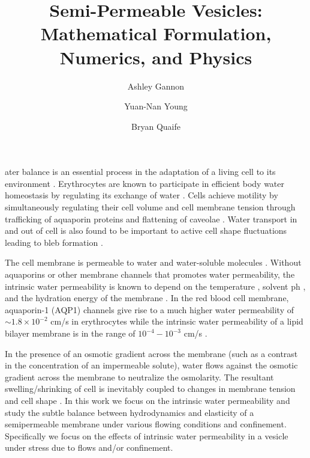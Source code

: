 \documentclass[9pt,twocolumn,twoside,lineno]{pnas-new}
\title{Semi-Permeable Vesicles: Mathematical Formulation, Numerics, and
Physics}
\author[a]{Ashley Gannon}
\author[b]{Yuan-Nan Young}
\author[a,1]{Bryan Quaife}
\affil[a]{Department of Scientific Computing, Florida State University}
\affil[b]{Department of Mathematical Sciences, New Jeresy Institute of
Technology}
\begin{document}
\maketitle
\thispagestyle{firststyle}


ater balance is an essential process in the adaptation of a living cell to its environment \cite{AlbertsMolecularBiology}.  Erythrocytes are known to  participate in efficient body water homeostasis by regulating its exchange of water  \cite{YangMaVerkman2001_JBC,SugieIntaglietta2018_AmJPhysiolHCP}.  Cells achieve motility by simultaneously regulating their cell volume and cell membrane tension through trafficking of aquaporin proteins \cite{SaadounPapadopoulosWatanabeEtAl2005_JCS,Verkman2008_JMM,BerthaudEtAl2016_SM} and flattening of caveolae \cite{Keren2011_EurBJ}. 
Water transport in and out of cell is also found to be important to 
active cell shape fluctuations leading to bleb formation \cite{TaloniKardashSalmanEtAl2015_PRL}.

The cell membrane is permeable to water and water-soluble molecules \cite{Dick1964_JTB,FettiplaceHaydon1980_PhysRev,DeamerBramhall1986_ChemPhysLipids,Grafmueller2019_ABLS}. Without aquaporins or other membrane channels that promotes water permeability, the intrinsic water permeability is known to depend on the temperature \cite{}, solvent ph \cite{}, and the hydration  energy of the membrane \cite{}. In the red blood cell membrane, aquaporin-1 (AQP1) channels give rise to a much higher water permeability of $\sim 1.8\times 10^{-2}$ cm/s in erythrocytes \cite{YangMaVerkman2001_JBC} while the intrinsic water permeability of a lipid bilayer membrane is in the range of $10^{-4}-10^{-3}$ cm/s \cite{ThompsonHuang1966_ANYAS,FettiplaceHaydon1980_PhysRev,Grafmueller2019_ABLS,Dimova2020_GVB}.


In the presence of an osmotic gradient across the membrane (such as a contrast in the concentration of an impermeable solute), water flows against the osmotic gradient across the membrane to neutralize the osmolarity.   The resultant swelling/shrinking of cell is inevitably coupled to changes in membrane tension and cell shape \cite{StrokaJiangChenEtAl2014_Cell,LiMoriSun2015_PRL}.
In this work we focus on the intrinsic water permeability and study the subtle balance between hydrodynamics and elasticity of a semipermeable membrane under various flowing conditions and confinement. Specifically we focus on the effects of intrinsic water permeability in a vesicle under stress due to flows and/or confinement.
\end{document}
